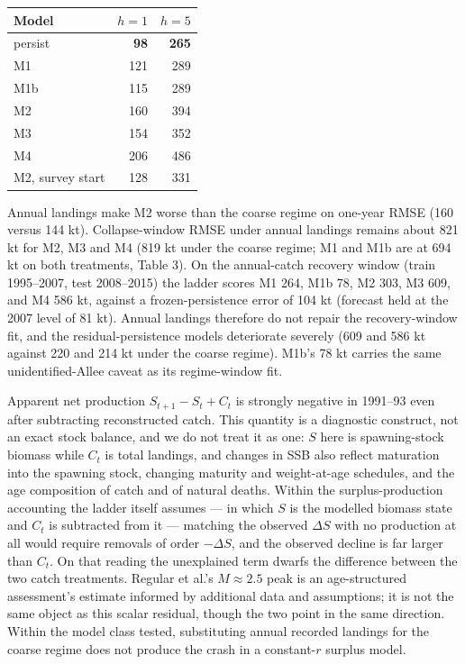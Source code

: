 \documentclass[11pt]{article}
\begin{document}
\begin{longtable}[]{@{}lrr@{}}
\toprule\noalign{}
Model & \(h=1\) & \(h=5\) \\
\midrule\noalign{}
\endhead
\bottomrule\noalign{}
\endlastfoot
persist & \textbf{98} & \textbf{265} \\
M1 & 121 & 289 \\
M1b & 115 & 289 \\
M2 & 160 & 394 \\
M3 & 154 & 352 \\
M4 & 206 & 486 \\
M2, survey start & 128 & 331 \\
\end{longtable}

Annual landings make M2 worse than the coarse regime on one-year RMSE
(160 versus 144 kt). Collapse-window RMSE under annual landings remains
about 821 kt for M2, M3 and M4 (819 kt under the coarse regime; M1 and
M1b are at 694 kt on both treatments, Table 3). On the annual-catch recovery window (train 1995--2007, test 2008--2015)
the ladder scores M1 264, M1b 78, M2 303, M3 609, and M4 586 kt, against
a frozen-persistence error of 104 kt (forecast held at the 2007 level of
81 kt). Annual landings therefore do not repair the recovery-window fit,
and the residual-persistence models deteriorate severely (609 and 586 kt
against 220 and 214 kt under the coarse regime). M1b's 78 kt carries the
same unidentified-Allee caveat as its regime-window fit.

Apparent net production \(S_{t+1}-S_t+C_t\) is strongly negative in
1991--93 even after subtracting reconstructed catch. This quantity is a
diagnostic construct, not an exact stock balance, and we do not treat it
as one: \(S\) here is spawning-stock biomass while \(C_t\) is total
landings, and changes in SSB also reflect maturation into the spawning
stock, changing maturity and weight-at-age schedules, and the age
composition of catch and of natural deaths. Within the surplus-production
accounting the ladder itself assumes --- in which \(S\) is the modelled
biomass state and \(C_t\) is subtracted from it --- matching the observed
\(\Delta S\) with no production at all would require removals of order
\(-\Delta S\), and the observed decline is far larger than \(C_t\). On
that reading the unexplained term dwarfs the difference between the two
catch treatments.
Regular et al.'s \(M \approx 2.5\) peak is an age-structured assessment's
estimate informed by additional data and assumptions; it is not the same
object as this scalar residual, though the two point in the same
direction. Within the model class tested, substituting annual recorded landings
for the coarse regime does not produce the crash in a constant-\(r\)
surplus model.
\end{document}
